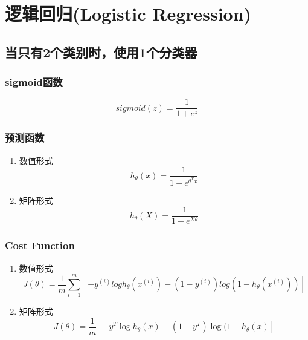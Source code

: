 \section{逻辑回归(Logistic Regression)}
\subsection{当只有2个类别时，使用1个分类器}

\subsubsection{sigmoid函数}
\begin{equation}
	sigmoid(z) = \frac{1}{1 + e^z}
\end{equation}


\subsubsection{预测函数}
\begin{enumerate}
\item 数值形式
\begin{equation}
	h_\theta(x) = \frac{1}{1 + e^{\theta^T x}}
\end{equation}

\item 矩阵形式
\begin{equation}
	h_\theta(X) = \frac{1}{1 + e^{X \theta}}
\end{equation}
\end{enumerate}


\subsubsection{Cost Function}
\begin{enumerate}
\item 数值形式
\begin{equation}
	J(\theta) = \frac{1}{m}
	    \sum_{i=1}^m \left[ -y^{(i)}log{h_\theta(x^{(i)})} - (1-y^{(i)})log{(1-h_\theta(x^{(i)}))} \right]
\end{equation}

\item 矩阵形式
\begin{equation}
		J(\theta) = \frac{1}{m} \left[-y^T \log{h_\theta(x)} - (1-y^T) \log{(1-h_\theta(x)}\right]
\end{equation}
\end{enumerate}


